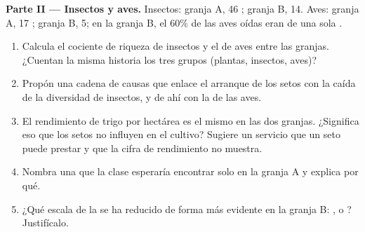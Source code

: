 \begin{problem}
\medskip
\noindent\textbf{Parte II --- Insectos y aves.}
Insectos: granja A, 46 ; granja B, 14. Aves: granja A, 17
; granja B, 5; en la granja B, el 60\% de las aves oídas eran
de una sola .
\begin{enumerate}[resume]
  \item Calcula el cociente de riqueza de insectos y el de aves entre
        las granjas. ¿Cuentan la misma historia los tres grupos
        (plantas, insectos, aves)?
  \item Propón una cadena de causas que enlace el arranque de los setos
        con la caída de la diversidad de insectos, y de ahí con la de
        las aves.
  \item El rendimiento de trigo por hectárea es el mismo en las dos
        granjas. ¿Significa eso que los setos no influyen en el
        cultivo? Sugiere un servicio que un seto puede prestar y que la
        cifra de rendimiento no muestra.
  \item Nombra una  que la clase esperaría encontrar solo en la
        granja A y explica por qué.
  \item ¿Qué escala de la  se ha reducido de forma más
        evidente en la granja B: ,  o ?
        Justifícalo.
\end{enumerate}


\end{problem}

